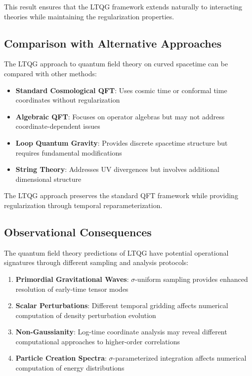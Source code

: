 This result ensures that the LTQG framework extends naturally to interacting theories while maintaining the regularization properties.

\subsection{Comparison with Alternative Approaches}
\label{subsec:qft_alternative_approaches}

The LTQG approach to quantum field theory on curved spacetime can be compared with other methods:

\begin{itemize}
\item \textbf{Standard Cosmological QFT}: Uses cosmic time or conformal time coordinates without regularization
\item \textbf{Algebraic QFT}: Focuses on operator algebras but may not address coordinate-dependent issues
\item \textbf{Loop Quantum Gravity}: Provides discrete spacetime structure but requires fundamental modifications
\item \textbf{String Theory}: Addresses UV divergences but involves additional dimensional structure
\end{itemize}

The LTQG approach preserves the standard QFT framework while providing regularization through temporal reparameterization.

\subsection{Observational Consequences}
\label{subsec:qft_observational_consequences}

The quantum field theory predictions of LTQG have potential operational signatures through different sampling and analysis protocols:

\begin{enumerate}
\item \textbf{Primordial Gravitational Waves}: $\sigma$-uniform sampling provides enhanced resolution of early-time tensor modes
\item \textbf{Scalar Perturbations}: Different temporal gridding affects numerical computation of density perturbation evolution
\item \textbf{Non-Gaussianity}: Log-time coordinate analysis may reveal different computational approaches to higher-order correlations
\item \textbf{Particle Creation Spectra}: $\sigma$-parameterized integration affects numerical computation of energy distributions
\end{enumerate}

